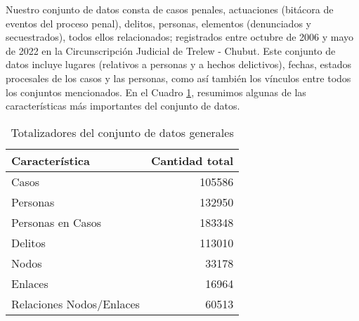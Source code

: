 Nuestro conjunto de datos consta de casos penales, actuaciones (bitácora de eventos del proceso penal), delitos, personas, elementos (denunciados y secuestrados), todos ellos relacionados; registrados entre octubre de 2006 y mayo de 2022 en la Circunscripción Judicial de Trelew - Chubut. 
Este conjunto de datos incluye lugares (relativos a personas y a hechos delictivos), fechas, estados procesales de los casos y las personas, como así también los vínculos entre todos los conjuntos mencionados. En el Cuadro \ref{tab:TotalizadoresGenerales}, resumimos algunas de las características más importantes del conjunto de datos.
\vspace{-10pt}
\begin{table}
	\centering
	\label{tab:TotalizadoresGenerales}
	\begin{tabular}{|l|r|}
		\hline
		\textbf{Característica} &  \textbf{Cantidad total} \\
		\hline
		Casos &  105586 \\
		\hline
		Personas &  132950 \\
		\hline
		Personas en Casos &  183348 \\
		\hline
		Delitos &  113010 \\
		\hline
		Nodos &  33178 \\
		\hline
		Enlaces &  16964 \\
		\hline
		Relaciones Nodos/Enlaces &  60513 \\
		\hline
	\end{tabular}
	\vspace{10pt}
	\caption{Totalizadores del conjunto de datos generales}
\end{table}
\vspace{-10pt}